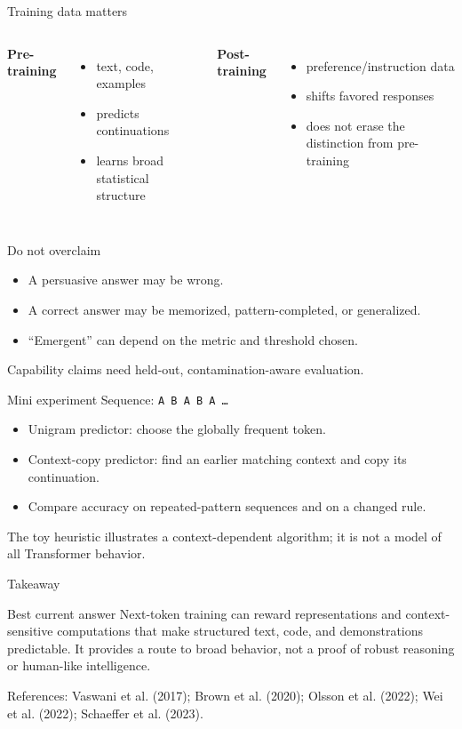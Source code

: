 \documentclass[aspectratio=169,10pt]{beamer}
\begin{document}
\begin{frame}{Training data matters}
\begin{columns}
\textbf{Pre-training}
\begin{itemize}\item text, code, examples\item predicts continuations\item learns broad statistical structure\end{itemize}
\textbf{Post-training}
\begin{itemize}\item preference/instruction data\item shifts favored responses\item does not erase the distinction from pre-training\end{itemize}
\end{columns}
\end{frame}
\begin{frame}{Do not overclaim}
\begin{itemize}
\item A persuasive answer may be wrong.
\item A correct answer may be memorized, pattern-completed, or generalized.
\item ``Emergent'' can depend on the metric and threshold chosen.
\end{itemize}
\alert{Capability claims need held-out, contamination-aware evaluation.}
\end{frame}
\begin{frame}{Mini experiment}
Sequence: \texttt{A B A B A \ldots}
\begin{itemize}
\item Unigram predictor: choose the globally frequent token.
\item Context-copy predictor: find an earlier matching context and copy its continuation.
\item Compare accuracy on repeated-pattern sequences and on a changed rule.
\end{itemize}
\vfill The toy heuristic illustrates a context-dependent algorithm; it is not a model of all Transformer behavior.
\end{frame}
\begin{frame}{Takeaway}
\begin{block}{Best current answer}
Next-token training can reward representations and context-sensitive computations that make structured text, code, and demonstrations predictable. It provides a route to broad behavior, not a proof of robust reasoning or human-like intelligence.
\end{block}
\vfill\small References: Vaswani et al. (2017); Brown et al. (2020); Olsson et al. (2022); Wei et al. (2022); Schaeffer et al. (2023).
\end{frame}
\end{document}
